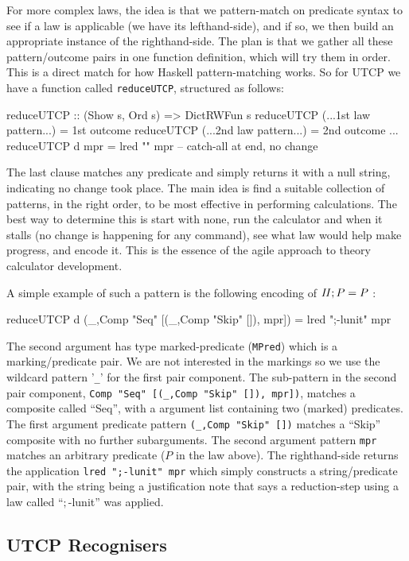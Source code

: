 For more complex laws,
the idea is that we pattern-match on predicate syntax
to see if a law is applicable (we have its lefthand-side),
and if so,
we then build an appropriate instance of the righthand-side.
The plan is that we gather all these pattern/outcome pairs
in one function definition,
which will try them in order.
This is a direct match for how Haskell pattern-matching works.
So for UTCP we have a function called \texttt{reduceUTCP},
structured as follows:
\begin{code}
reduceUTCP :: (Show s, Ord s) => DictRWFun s
reduceUTCP (...1st law pattern...) = 1st outcome
reduceUTCP (...2nd law pattern...) = 2nd outcome
...
reduceUTCP d mpr = lred "" mpr  -- catch-all at end, no change
\end{code}
The last clause matches any predicate
and simply returns it with a null string,
indicating no change took place.
The main idea is find a suitable collection of patterns,
in the right order,
to be most effective in performing calculations.
The best way to determine this is start with none,
run the calculator and when it stalls
(no change is happening for any command),
see what law would help make progress, and encode it.
This is the essence of the agile approach to theory calculator development.

A simple example of such a pattern is the following encoding
of $\mathit{II};P = P$ :
\begin{code}
reduceUTCP d
 (_,Comp "Seq" [(_,Comp "Skip" []), mpr]) = lred ";-lunit" mpr
\end{code}
The second argument has type marked-predicate (\texttt{MPred})
which is a marking/predicate pair.
We are not interested in the markings
so we use the wildcard pattern '\verb"_"'
for the first pair component.
The sub-pattern in the second pair component,
\verb'Comp "Seq" [(_,Comp "Skip" []), mpr])',
matches a composite called ``Seq'',
with a argument list containing two (marked) predicates.
The first argument predicate pattern \verb'(_,Comp "Skip" [])'
matches a ``Skip'' composite with no further subarguments.
The second argument pattern \verb'mpr' matches an arbitrary predicate
($P$ in the law above).
The righthand-side returns the application \verb'lred ";-lunit" mpr'
which simply constructs a string/predicate pair,
with the string being a justification note that says a reduction-step
using a law called ``$;$-lunit'' was applied.



\subsection{UTCP Recognisers}

